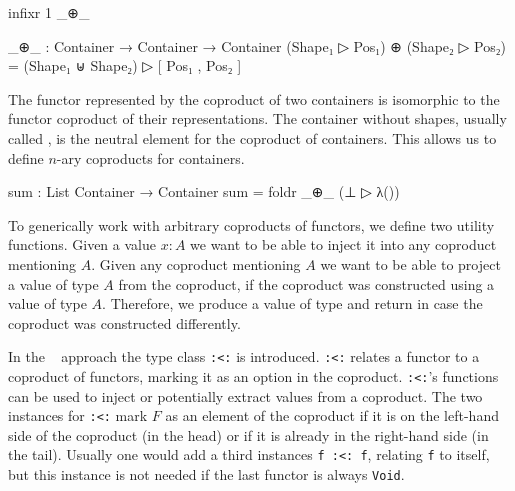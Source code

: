 \begin{code}[hide]
infixr 1 _⊕_
\end{code}
\begin{code}
_⊕_ : Container → Container → Container
(Shape₁ ▷ Pos₁) ⊕ (Shape₂ ▷ Pos₂) = (Shape₁ ⊎ Shape₂) ▷ [ Pos₁ , Pos₂ ]
\end{code}
The functor represented by the coproduct of two containers is isomorphic to the
functor coproduct of their representations.
The container without shapes, usually called , is the neutral
element for the coproduct of containers.
This allows us to define $n$-ary coproducts for containers.

\begin{code}
sum : List Container → Container
sum = foldr _⊕_ (⊥ ▷ λ())
\end{code}
To generically work with arbitrary coproducts of functors, we define two utility
functions.
Given a value $x:A$ we want to be able to inject it into any coproduct
mentioning $A$.
Given any coproduct mentioning $A$ we want to be able to project a value of
type $A$ from the coproduct, if the coproduct was constructed using a value of
type $A$.
Therefore, we produce a value of type
\AgdaSpace{} and return
 in case the coproduct was constructed
differently.

In the
~\cite{DBLP:journals/jfp/Swierstra08}
approach the type class \texttt{:<:} is introduced.
\texttt{:<:} relates a functor to a coproduct of functors, marking it as an
option in the coproduct.
\texttt{:<:}'s functions can be used to inject or potentially extract values
from a coproduct.
The two instances for \texttt{:<:} mark $F$ as an element of the coproduct if
it is on the left-hand side of the coproduct (in the head) or if it is already
in the right-hand side (in the tail).
Usually one would add a third instances \texttt{f :<: f}, relating \texttt{f} to
itself, but this instance is not needed if the last functor is always
\texttt{Void}.

